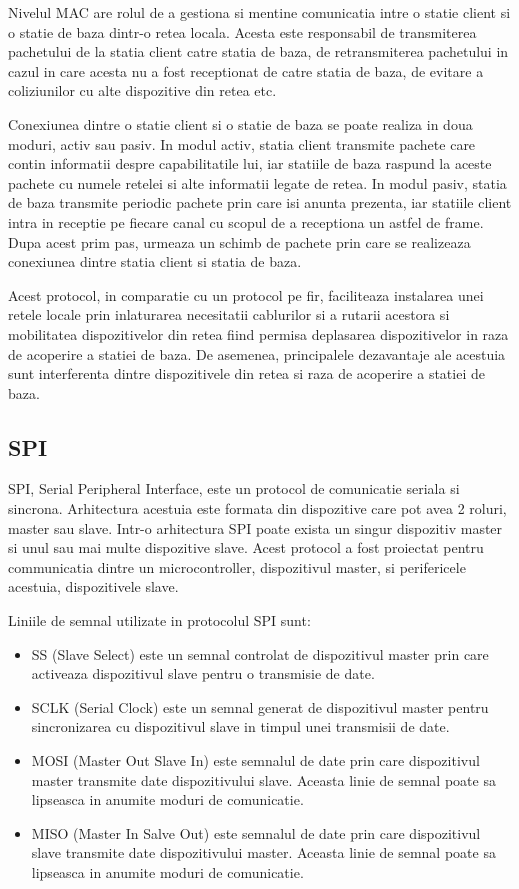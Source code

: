 Nivelul MAC are rolul de a gestiona si mentine comunicatia intre o statie client si o statie de baza dintr-o retea locala. Acesta este responsabil de 
transmiterea pachetului de la statia client catre statia de baza, de retransmiterea pachetului in cazul in care acesta nu a fost receptionat de catre 
statia de baza, de evitare a coliziunilor cu alte dispozitive din retea etc.

Conexiunea dintre o statie client si o statie de baza se poate realiza in doua moduri, activ sau pasiv. In modul activ, statia client transmite pachete 
care contin informatii despre capabilitatile lui, iar statiile de baza raspund la aceste pachete cu numele retelei si alte informatii legate de retea. 
In modul pasiv, statia de baza transmite periodic pachete prin care isi anunta prezenta, iar statiile client intra in receptie pe fiecare canal cu scopul 
de a receptiona un astfel de frame. Dupa acest prim pas, urmeaza un schimb de pachete prin care se realizeaza conexiunea dintre statia client si statia de baza.

Acest protocol, in comparatie cu un protocol pe fir, faciliteaza instalarea unei retele locale prin inlaturarea necesitatii cablurilor si a rutarii acestora 
si mobilitatea dispozitivelor din retea fiind permisa deplasarea dispozitivelor in raza de acoperire a statiei de baza. De asemenea, principalele dezavantaje 
ale acestuia sunt interferenta dintre dispozitivele din retea si raza de acoperire a statiei de baza.

\subsection{SPI}\label{sec:spi}
SPI, Serial Peripheral Interface, este un protocol de comunicatie seriala si sincrona. Arhitectura acestuia este formata din dispozitive care pot avea 2 
roluri, master sau slave. Intr-o arhitectura SPI poate exista un singur dispozitiv master si unul sau mai multe dispozitive slave. Acest protocol a fost 
proiectat pentru communicatia dintre un microcontroller, dispozitivul master, si perifericele acestuia, dispozitivele slave. 

Liniile de semnal utilizate in protocolul SPI sunt:
\begin{itemize}
    \item SS (Slave Select) este un semnal controlat de dispozitivul master prin care activeaza dispozitivul slave pentru o transmisie de date.
    \item SCLK (Serial Clock) este un semnal generat de dispozitivul master pentru sincronizarea cu dispozitivul slave in timpul unei transmisii de date.
    \item MOSI (Master Out Slave In) este semnalul de date prin care dispozitivul master transmite date dispozitivului slave. Aceasta linie de semnal 
    poate sa lipseasca in anumite moduri de comunicatie.
    \item MISO (Master In Salve Out) este semnalul de date prin care dispozitivul slave transmite date dispozitivului master. Aceasta linie de semnal 
    poate sa lipseasca in anumite moduri de comunicatie.
\end{itemize}

